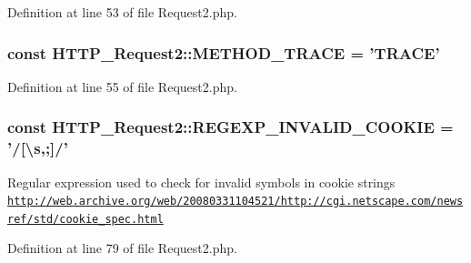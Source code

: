 Definition at line 53 of file Request2.\-php.

\hypertarget{classHTTP__Request2_a9877a1980431a869bce427ec64c923eb}{
\subsubsection[{M\-E\-T\-H\-O\-D\-\_\-\-T\-R\-A\-C\-E}]{\setlength{\rightskip}{0pt plus 5cm}const H\-T\-T\-P\-\_\-\-Request2\-::\-M\-E\-T\-H\-O\-D\-\_\-\-T\-R\-A\-C\-E = 'T\-R\-A\-C\-E'}}\label{classHTTP__Request2_a9877a1980431a869bce427ec64c923eb}


Definition at line 55 of file Request2.\-php.

\hypertarget{classHTTP__Request2_ab7fc574a0035ac8e940f6cd3456b0c28}{
\subsubsection[{R\-E\-G\-E\-X\-P\-\_\-\-I\-N\-V\-A\-L\-I\-D\-\_\-\-C\-O\-O\-K\-I\-E}]{\setlength{\rightskip}{0pt plus 5cm}const H\-T\-T\-P\-\_\-\-Request2\-::\-R\-E\-G\-E\-X\-P\-\_\-\-I\-N\-V\-A\-L\-I\-D\-\_\-\-C\-O\-O\-K\-I\-E = '/\mbox{[}\textbackslash{}s,;\mbox{]}/'}}\label{classHTTP__Request2_ab7fc574a0035ac8e940f6cd3456b0c28}
Regular expression used to check for invalid symbols in cookie strings \hyperlink{}{\href{http://web.archive.org/web/20080331104521/http://cgi.netscape.com/newsref/std/cookie_spec.html}{\tt http\-://web.\-archive.\-org/web/20080331104521/http\-://cgi.\-netscape.\-com/newsref/std/cookie\-\_\-spec.\-html} }

Definition at line 79 of file Request2.\-php.

